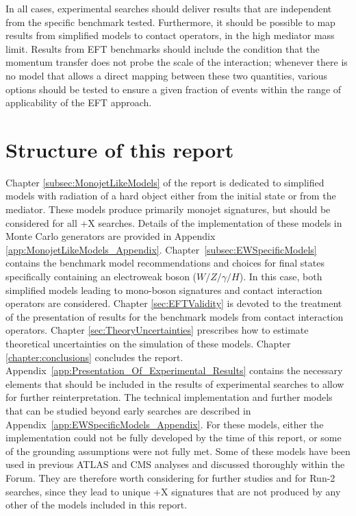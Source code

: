 In all cases, experimental searches should deliver 
results that are independent from the specific benchmark tested. 
Furthermore, it should be possible to map results from simplified models to contact operators,
in the high mediator mass limit. Results from EFT benchmarks should include the condition that
the momentum transfer does not probe the scale of the interaction; whenever there is no model
that allows a direct mapping between these two quantities, various options should be tested to 
ensure a given fraction of events within the range of applicability of the EFT approach.

\section{Structure of this report}

Chapter \ref{subsec:MonojetLikeModels} of the report is dedicated to simplified
models with radiation of a hard object either from the initial state
or from the mediator. These models produce primarily monojet signatures, 
but should be considered for all \MET{}+X searches.
Details of the implementation of these models in
Monte Carlo generators are provided in
Appendix \ref{app:MonojetLikeModels_Appendix}.
Chapter~\ref{subsec:EWSpecificModels} contains the benchmark model
recommendations and choices for final states specifically containing an electroweak 
boson ($W/Z/\gamma/H$). In this case, both 
simplified models leading to mono-boson signatures
and contact interaction operators are considered. 
Chapter \ref{sec:EFTValidity} is devoted to the treatment of the presentation of results for the benchmark
models from contact interaction operators. Chapter \ref{sec:TheoryUncertainties} prescribes how to estimate theoretical uncertainties on the simulation of these models. Chapter \ref{chapter:conclusions} concludes the report.
Appendix~\ref{app:Presentation_Of_Experimental_Results} contains the necessary elements that
should be included in the results of experimental searches to allow for further reinterpretation. 
The technical implementation and further models that can be studied
beyond early searches are described in Appendix~\ref{app:EWSpecificModels_Appendix}. 
For these models, either the implementation could not be fully developed by the time of this report,
or some of the grounding assumptions were not fully met.  
Some of these models have been used in previous ATLAS and CMS analyses and discussed thoroughly within the Forum. 
They are therefore worth considering for further studies and for Run-2 searches, since they lead to unique \MET{}+X signatures 
that are not produced by any other of the models included in this report. 
